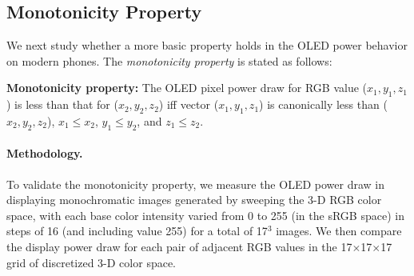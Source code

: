 \subsection{Monotonicity Property}
\label{subsec:monoproperty}

We next study whether a more basic property holds in the OLED power
behavior on modern phones.  The {\em monotonicity property} is stated
as follows:

\noindent
{\bf Monotonicity property:}
The OLED pixel power draw for RGB value ($x_1, y_1, z_1$)
is less than that for ($x_2, y_2, z_2$) iff
vector ($x_1, y_1, z_1$) is canonically less than ($x_2, y_2, z_2$),
\ie $x_1 \leq x_2$, $y_1 \leq y_2$, and $z_1 \leq z_2$.

\paragraph{Methodology.}
To validate the monotonicity property, we measure the OLED power draw
in displaying monochromatic images generated by sweeping the 3-D RGB
color space, with each base color intensity varied from 0 to 255 (in
the sRGB space) in steps of 16 (and including value 255) for a total
of 17$^3$ images. We then compare the display power
draw for each pair of adjacent RGB values in the
17$\times$17$\times$17 grid of discretized 3-D color space.





